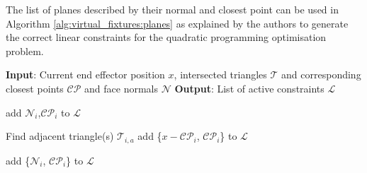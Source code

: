 The list of planes described by their normal and closest point can be used in Algorithm \ref{alg:virtual_fixtures:planes} as explained by the authors to generate the correct linear constraints for the quadratic programming optimisation problem.
\begin{algorithm}
    \begin{algorithmic}
    \State \textbf{Input}: Current end effector position 
    $x$, intersected triangles $\mathcal{T}$ and corresponding closest points $\mathcal{CP}$ and face normals $\mathcal{N}$
    \State \textbf{Output}: List of active constraints $\mathcal{L}$

            \State add $\mathcal{N}_i$,$\mathcal{CP}_i$ to $\mathcal{L}$
        
            \State Find adjacent triangle(s) $\mathcal{T}_{i,a}$
                \State add \{$x-\mathcal{CP}_i$, $\mathcal{CP}_i$\} to $\mathcal{L}$
            
                \State add \{$\mathcal{N}_i$, $\mathcal{CP}_i$\} to $\mathcal{L}$
            \EndIf 
        \EndIf
    \EndFor
    \end{algorithmic}
    \caption{Mesh Linear Constraints Computation}
    \label{alg:virtual_fixtures:planes}
\end{algorithm}